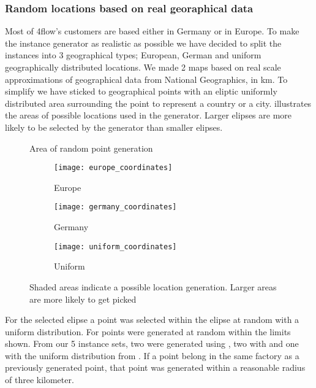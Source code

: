 \documentclass[../main.tex]{subfiles}
\begin{document}
\subsubsection{Random locations based on real georaphical data}
Most of 4flow's customers are based either in Germany or in Europe. 
To make the instance generator as realistic as possible we have decided to split the instances into 3 geographical types; 
European, German and uniform geographically distributed locations.
We made 2 maps based on real scale approximations of geographical data from National Geographics, in km.
To simplify we have sticked to geographical points with an eliptic uniformly distributed area surrounding the point to represent a country or a city.
 illustrates the areas of possible locations used in the generator. 
Larger elipses are more likely to be selected by the generator than smaller elipses.
\begin{figure}
\centering
    \caption{Area of random point generation}
    \begin{subfigure}[b]{0.3\textwidth}
        \centering
        \texttt{[image: europe\_coordinates]}
        \caption{Europe}
        \label{fig:eur}
    \end{subfigure}
    \hfill
    \begin{subfigure}[b]{0.3\textwidth}
        \centering
        \texttt{[image: germany\_coordinates]}
        \caption{Germany}
        \label{fig:ger}
    \end{subfigure}
    \hfill
    \begin{subfigure}[b]{0.3\textwidth}
        \centering
        \texttt{[image: uniform\_coordinates]}
        \caption{Uniform}
        \label{fig:uni}
    \end{subfigure}
    \label{fig:areas}
    \caption*{Shaded areas indicate a possible location generation. Larger areas are more likely to get picked}
\end{figure}

For the selected elipse a point was selected within the elipse at random with a uniform distribution.
For  points were generated at random within the limits shown.
From our 5 instance sets, two were generated using , two with  and one with the uniform distribution from . 
If a point belong in the same factory as a previously generated point, that point was generated within a reasonable radius of three kilometer.
\end{document}
